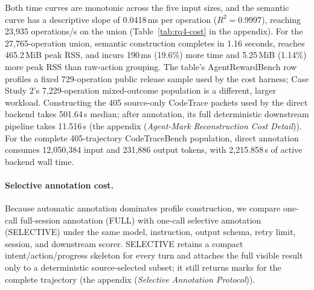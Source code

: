 \documentclass[letterpaper]{article}
\begin{document}
Both time curves are monotonic across the five input sizes, and the semantic
curve has a descriptive slope of 0.0418\,ms per operation ($R^2=0.9997$),
reaching 23{,}935 operations/s on the union
(Table~\ref{tab:rq4-cost} in the appendix).
For the 27{,}765-operation union, semantic construction completes in 1.16
seconds, reaches 465.2\,MiB peak RSS, and incurs 190\,ms (19.6\%) more time and
5.25\,MiB (1.14\%) more peak RSS than raw-action grouping.
The table's AgentRewardBench row profiles a fixed 729-operation public
release sample used by the cost harness; Case Study 2's 7{,}229-operation
mixed-outcome population is a different, larger workload.
Constructing the 405 source-only CodeTrace packets used by the direct backend
takes 501.64\,s median; after annotation, its full deterministic downstream
pipeline takes 11.516\,s (the appendix (\emph{Agent-Mark Reconstruction Cost Detail})).
For the complete 405-trajectory CodeTraceBench population, direct annotation
consumes 12{,}050{,}384 input and 231{,}886 output tokens, with
2{,}215.858\,s of active backend wall time.

\paragraph{Selective annotation cost.}
Because automatic annotation dominates profile construction, we compare
one-call full-session annotation (FULL) with one-call selective annotation
(SELECTIVE) under the same model, instruction, output schema, retry limit,
session, and downstream scorer.
SELECTIVE retains a compact intent/action/progress skeleton for every turn and
attaches the full visible result only to a deterministic source-selected
subset; it still returns marks for the complete trajectory
(the appendix (\emph{Selective Annotation Protocol})).
\end{document}
